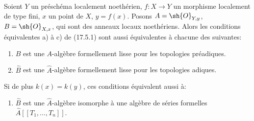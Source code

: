 \begin{proposition}[17.5.3]
\label{IV.17.5.3}
Soient $Y$ un préschéma localement noethérien, $f:X\to Y$ un morphisme localement de type fini, $x$ un point de $X$, $y=f(x)$. Posons $A=\sh{O}_{Y,y}$, $B=\sh{O}_{X,x}$, qui sont des anneaux locaux noethériens. Alors les conditions équivalentes a) à c) de (17.5.1) sont aussi équivalentes à chacune des suivantes:
\begin{enumerate}
  \item[d)] $B$ est une $A$-algèbre formellement lisse pour les topologies préadiques.
  \item[d')] $\widehat B$ est une $\widehat A$-algèbre formellement lisse pour les topologies adiques.
\end{enumerate}
Si de plus $k(x)=k(y)$, ces conditions équivalent aussi à:
\begin{enumerate}
  \item[d'')] $\widehat B$ est une $\widehat A$-algèbre isomorphe à une algèbre de séries formelles $\widehat A[[T_1,\ldots,T_n]]$.
\end{enumerate}
\end{proposition}

